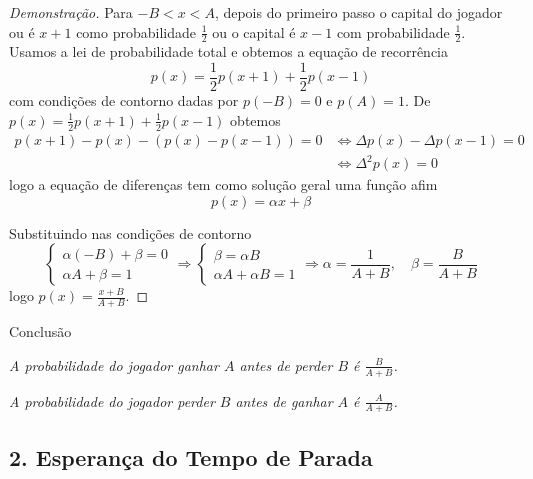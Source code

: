 \documentclass{article}
\begin{document}
\begin{proof}[Demonstração]
  Para \( -B < x < A \), depois do primeiro passo o capital do jogador
  ou é $x+1$ como probabilidade $\tfrac 12$ ou o capital é $x-1$ com
  probabilidade $\tfrac 12$. Usamos a lei de probabilidade total e obtemos  a equação de recorrência
  \[
    p(x) = \frac{1}{2}p(x+1) + \frac{1}{2}p(x-1)
  \]
  com condições de contorno dadas por \( p(-B) = 0\) e \(p(A) = 1\).
  De \( p(x) = \frac{1}{2}p(x+1) + \frac{1}{2}p(x-1) \) obtemos
  \begin{align*}
    p(x+1) - p(x) - (p(x) - p(x-1))= 0 &\Leftrightarrow 
    \Delta p(x) - \Delta p(x-1) = 0 \\&\Leftrightarrow
    \Delta^2 p(x) = 0
  \end{align*}
  logo a equação de diferenças tem como solução geral uma função afim 
  \[
    p(x) = \alpha x + \beta
  \]
  
  Substituindo nas condições de contorno
  \[
    \begin{cases}
      \alpha(-B) + \beta = 0 \\
      \alpha A + \beta = 1
    \end{cases}
    \Rightarrow 
    \begin{cases}
      \beta = \alpha B \\
      \alpha A + \alpha B = 1
    \end{cases}
    \Rightarrow \alpha = \frac{1}{A + B}, \quad \beta = \frac{B}{A + B}
  \]
  logo \(    p(x) = \frac{x + B}{A + B}.\) 
\end{proof}

Conclusão

\emph{A probabilidade do jogador ganhar $A$ antes de perder $B$ é $\tfrac B{A+B}$.}

\emph{A probabilidade do jogador perder $B$ antes de ganhar $A$ é $\tfrac A{A+B}$.}


\subsection*{2. Esperança do Tempo de Parada}
\end{document}
